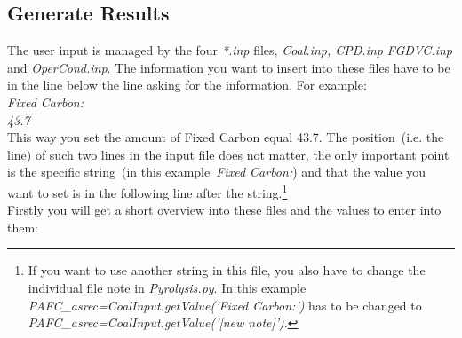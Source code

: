 \subsection{Generate Results}\label{SS_Generate_Results}
The user input is managed by the four \emph{*.inp} files, \emph{Coal.inp, CPD.inp} \emph{FGDVC.inp} and \emph{OperCond.inp}. The information you want to insert into these files have to be in the line below the line asking for the information. For example:\\
\emph{Fixed Carbon:\\
43.7}\\
This way you set the amount of Fixed Carbon equal 43.7. The position~(i.e. the line) of such two lines in the input file does not matter, the only important point is the specific string~(in this example~\emph{Fixed Carbon:}) and that the value you want to set is in the following line after the string.\footnote{If you want to use another string in this file, you also have to change the individual file note in \emph{Pyrolysis.py}. In this example \emph{PAFC\_asrec=CoalInput.getValue('Fixed Carbon:')} has to be changed to \emph{PAFC\_asrec=CoalInput.getValue('[new note]')}.}\\
Firstly you will get a short overview into these files and the values to enter into them:\\
